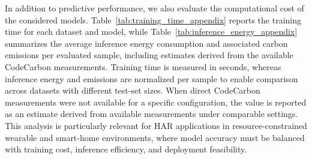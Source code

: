 \documentclass[preprint,12pt]{elsarticle}
\begin{document}
In addition to predictive performance, we also evaluate the computational cost of the considered models. Table~\ref{tab:training_time_appendix} reports the training time for each dataset and model, while Table~\ref{tab:inference_energy_appendix} summarizes the average inference energy consumption and associated carbon emissions per evaluated sample, including estimates derived from the available CodeCarbon measurements. Training time is measured in seconds, whereas inference energy and emissions are normalized per sample to enable comparison across datasets with different test-set sizes. When direct CodeCarbon measurements were not available for a specific configuration, the value is reported as an estimate derived from available measurements under comparable settings. This analysis is particularly relevant for HAR applications in resource-constrained wearable and smart-home environments, where model accuracy must be balanced with training cost, inference efficiency, and deployment feasibility.

\begin{table}[t]
\centering
\scriptsize
\caption{Training time in seconds by dataset and model}
\label{tab:training_time_appendix}
\end{table}
\end{document}
